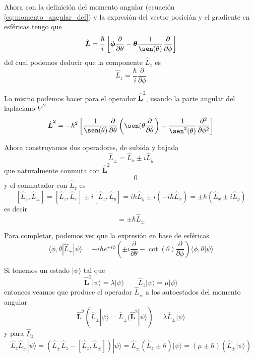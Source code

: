 Ahora con la definición del momento angular (ecuación \ref{eq:momento_angular_def}) y la expresión del vector posición y el gradiente en esféricas tengo que
\begin{equation}
    \hat{\boldsymbol{L}} = \frac{\hbar}{i} \left[ \boldsymbol{\phi} \frac{\partial}{\partial \theta} - \boldsymbol{\theta} \frac{1}{\sen(\theta)} \frac{\partial}{\partial \phi} \right]
\end{equation}
del cual podemos deducir que la componente $\hat{L}_z$ es
\begin{equation}
    \hat{L}_z = \frac{\hbar}{i} \frac{\partial}{\partial \phi}
\end{equation}

Lo mismo podemos hacer para el operador $\hat{\boldsymbol{L}}^2$, usando la parte angular del laplaciano $\nabla^2$
\begin{equation}
\hat{\boldsymbol{L}}^2 = - \hbar^2  \left[ \frac{1}{\sen(\theta)} \frac{\partial}{\partial \theta} \left(\sen(\theta \frac{\partial}{\partial \theta} \right) + \frac{1}{\sen^2(\theta)} \frac{\partial^2}{\partial \phi^2} \right]
\end{equation}

Ahora construyamos dos operadores, de subida y bajada
\begin{equation}
    \hat{L}_{\pm} = \hat{L}_x \pm i \hat{L}_y
\end{equation}
que naturalmente conmuta con $\hat{\boldsymbol{L}}^2$
\begin{equation}
    [\hat{\boldsymbol{L}}^2, \hat{L}_\pm] = 0
\end{equation}
y el conmutador con $\hat{L}_z$ es
\[ [\hat{L}_z, \hat{L}_\pm ] = [\hat{L}_z, \hat{L}_x] \pm i [\hat{L}_z, \hat{L}_y] = i\hbar \hat{L}_y \pm i (-i\hbar \hat{L}_x) = \pm \hbar (\hat{L}_x \pm i \hat{L}_y)\]
es decir
\begin{equation}
    [\hat{L}_z, \hat{L}_\pm ] = \pm \hbar \hat{L}_\pm
\end{equation}

Para completar, podemos ver que la expresión en base de esféricas
\begin{equation}
    \langle \phi, \theta | \hat{L}_\pm | \psi \rangle = - i \hbar e^{\pm i \phi}\left(\pm i \frac{\partial}{\partial \theta} - \cot(\theta) \frac{\partial}{\partial \phi} \right) \langle \phi, \theta | \psi \rangle
    \label{eq:momento_operador_subibda_coordeanas}
\end{equation}

Si tenemos un estado $|\psi\rangle$ tal que
\begin{equation}
    \hat{\boldsymbol{L}}^2 |\psi\rangle = \lambda |\psi\rangle \qquad \hat{L}_z |\psi\rangle = \mu |\psi\rangle
\end{equation}
entonces veamos que produce el operador $\hat{L}_\pm$ a los autoestados del momento angular
\[\hat{\boldsymbol{L}}^2 (\hat{L}_\pm |\psi\rangle = \hat{L}_\pm (\hat{\boldsymbol{L}}^2 |\psi\rangle) = \lambda \hat{L}_\pm |\psi\rangle \]
y para $\hat{L}_z$
\[\hat{L}_z \hat{L}_\pm |\psi\rangle = (\hat{L}_\pm \hat{L}_z - [\hat{L}_z, \hat{L}_\pm]) |\psi\rangle = \hat{L}_\pm (\hat{L}_z \pm \hbar) |\psi\rangle = (\mu \pm \hbar) (\hat{L}_\pm |\psi\rangle) \]

